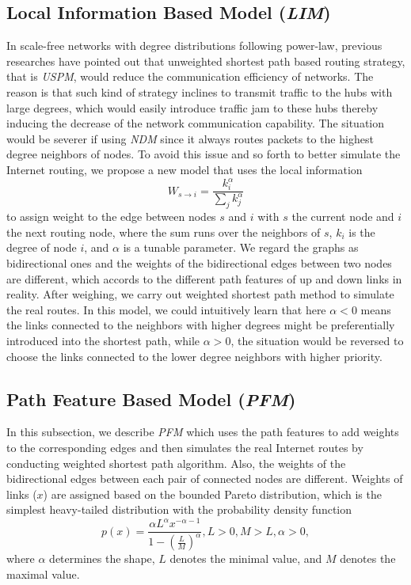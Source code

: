\documentclass[a4paper]{llncs}
\begin{document}
\subsection{Local Information Based Model (\textit{LIM})}
In scale-free networks with degree distributions following
power-law, previous researches \cite{TrafficDynamicLocal,EfficientRouting}
have pointed out that unweighted shortest path based routing
strategy, that is \textit{USPM}, would reduce the communication
efficiency of networks. The reason is that such kind of strategy inclines to transmit traffic to the hubs with large degrees, which would easily introduce traffic jam to these hubs thereby inducing the decrease of the network communication capability. The situation would be severer if using \textit{NDM} since it always routes packets to the highest degree neighbors of nodes. To avoid this issue and so forth to better simulate the Internet routing, we propose a new model that uses the local information
\begin{equation}
\label{eq:lim}
W_{s\rightarrow i}=\frac{k_{i}^{\alpha}}{\sum_{j}k_{j}^{\alpha}}
\end{equation}
to assign weight to the edge between nodes $s$ and $i$ with $s$ the current node and $i$ the next routing node, where the sum runs over the neighbors of $s$, $k_i$ is the degree of node $i$, and $\alpha$ is a tunable parameter. We regard the graphs as bidirectional ones and
the weights of the bidirectional edges between two nodes are different, which accords to the different path features of up and down links in reality. After weighing, we carry out weighted shortest path method to simulate the real routes. In this model,
we could intuitively learn that here $\alpha<0$ means the links connected to the neighbors with
higher degrees might be preferentially introduced into the shortest
path, while $\alpha>0$, the situation would be reversed to choose the links connected to the lower degree neighbors with higher priority.

\subsection{Path Feature Based Model (\textit{PFM})}
In this subsection, we describe \textit{PFM} which uses the path features to add weights to the corresponding edges and then simulates the real Internet routes by conducting weighted shortest path algorithm. Also, the weights of the bidirectional edges between each pair of connected nodes are different. Weights of links ($x$) are assigned based on the bounded Pareto distribution, which is the simplest heavy-tailed distribution with the probability density function
\begin{equation}
\label{eq:pareto_distr}
p(x)=\frac{\alpha L^{\alpha} x^{-\alpha -
1}}{1 - (\frac{L}{M})^{\alpha}}, L > 0, M > L, \alpha > 0,
\end{equation}
where $\alpha$ determines the shape, $L$ denotes the minimal value, and $M$ denotes the maximal value.
\end{document}
